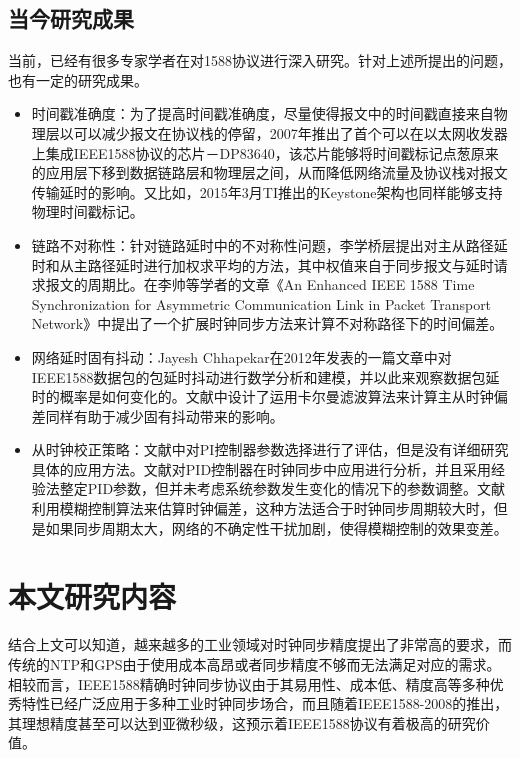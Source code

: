 \subsection{当今研究成果}
\label{sec:1588_problem_research}
当前，已经有很多专家学者在对1588协议进行深入研究。针对上述所提出的问题，也有一定的研究成果。
\begin{itemize}[noitemsep,topsep=0pt,parsep=0pt,partopsep=0pt]
	\item 时间戳准确度：为了提高时间戳准确度，尽量使得报文中的时间戳直接来自物理层以可以减少报文在协议栈的停留，2007年推出了首个可以在以太网收发器上集成IEEE1588协议的芯片－DP83640\supercite{4}，该芯片能够将时间戳标记点葱原来的应用层下移到数据链路层和物理层之间，从而降低网络流量及协议栈对报文传输延时的影响。又比如，2015年3月TI推出的Keystone架构也同样能够支持物理时间戳标记\supercite{5}。
	\item 链路不对称性：针对链路延时中的不对称性问题，李学桥层提出对主从路径延时和从主路径延时进行加权求平均的方法，其中权值来自于同步报文与延时请求报文的周期比\supercite{6}。在李帅等学者的文章《An Enhanced IEEE 1588 Time Synchronization for Asymmetric Communication Link in Packet Transport Network》中提出了一个扩展时钟同步方法来计算不对称路径下的时间偏差\supercite{7}。
	\item 网络延时固有抖动：Jayesh Chhapekar在2012年发表的一篇文章中对IEEE1588数据包的包延时抖动进行数学分析和建模，并以此来观察数据包延时的概率是如何变化的\supercite{8}。文献\parencite{9}中设计了运用卡尔曼滤波算法来计算主从时钟偏差同样有助于减少固有抖动带来的影响。
	\item 从时钟校正策略：文献\parencite{10}中对PI控制器参数选择进行了评估，但是没有详细研究具体的应用方法。文献\parencite{11}对PID控制器在时钟同步中应用进行分析，并且采用经验法整定PID参数，但并未考虑系统参数发生变化的情况下的参数调整。文献\parencite{12}利用模糊控制算法来估算时钟偏差，这种方法适合于时钟同步周期较大时，但是如果同步周期太大，网络的不确定性干扰加剧，使得模糊控制的效果变差。
\end{itemize}

\section{本文研究内容}
结合上文可以知道，越来越多的工业领域对时钟同步精度提出了非常高的要求，而传统的NTP和GPS由于使用成本高昂或者同步精度不够而无法满足对应的需求。相较而言，IEEE1588精确时钟同步协议由于其易用性、成本低、精度高等多种优秀特性已经广泛应用于多种工业时钟同步场合，而且随着IEEE1588-2008的推出，其理想精度甚至可以达到亚微秒级，这预示着IEEE1588协议有着极高的研究价值。


